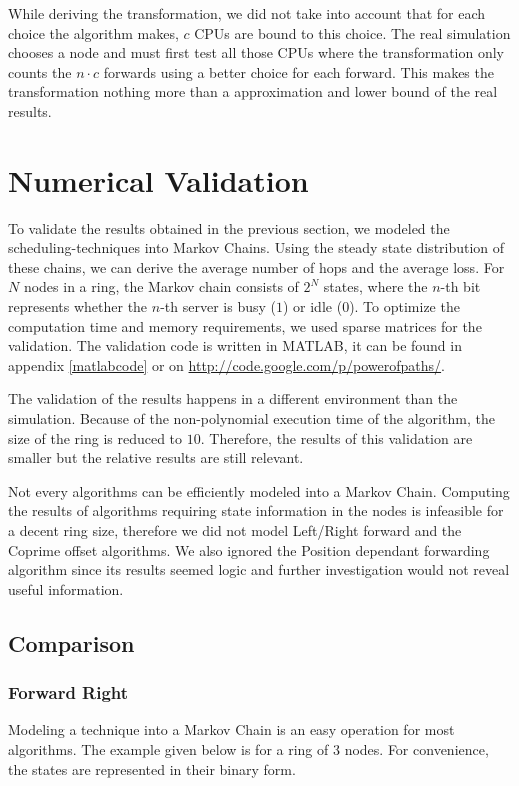\documentclass[10pt,a4paper]{article}
\begin{document}
While deriving the transformation, we did not take into account that for each choice the algorithm makes, $c$ CPUs are bound to this choice. The real simulation chooses a node and must first test all those CPUs where the transformation only counts the $n \cdot c$ forwards using a better choice for each forward. This makes the transformation nothing more than a approximation and lower bound of the real results.

\section{Numerical Validation}
\label{secvalidation}

To validate the results obtained in the previous section, we modeled the scheduling-techniques into Markov Chains. Using the steady state distribution of these chains, we can derive the average number of hops and the average loss.
For $N$ nodes in a ring, the Markov chain consists of $2^N$ states, where the $n$-th bit represents whether the $n$-th server is busy ($1$) or idle ($0$). To optimize the computation time and memory requirements, we used sparse matrices for the validation. The validation code is written in MATLAB, it can be found in appendix \ref{matlabcode} or on \url{http://code.google.com/p/powerofpaths/}.

The validation of the results happens in a different environment than the simulation. Because of the non-polynomial execution time of the algorithm, the size of the ring is reduced to $10$. Therefore, the results of this validation are smaller but the relative results are still relevant.

Not every algorithms can be efficiently modeled into a Markov Chain. Computing the results of algorithms requiring state information in the nodes is infeasible for a decent ring size, therefore we did not model Left/Right forward and the Coprime offset algorithms. We also ignored the Position dependant forwarding algorithm since its results seemed logic and further investigation would not reveal useful information.

\subsection{Comparison}
\subsubsection*{Forward Right}
Modeling a technique into a Markov Chain is an easy operation for most algorithms. The example given below is for a ring of 3 nodes. For convenience, the states are represented in their binary form.
\end{document}
